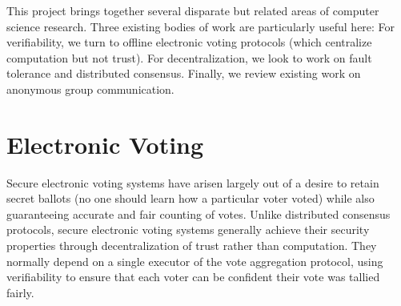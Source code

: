%
%
%
This project brings together several disparate but related areas of computer
science research.  Three existing bodies of work are particularly useful here:
For verifiability, we turn to offline electronic voting protocols (which
centralize computation but not trust). For decentralization, we look to work on
fault tolerance and distributed consensus.
Finally, we review existing work on anonymous group communication.
\section{Electronic Voting} \label{Section:evoting}
    Secure electronic voting systems have arisen largely out of a desire to
    retain secret ballots (no one should learn how a particular voter voted)
    while also guaranteeing accurate and fair counting of votes. Unlike
    distributed consensus protocols, secure electronic voting systems generally
    achieve their security properties through decentralization of trust rather
    than computation. They normally depend on a single executor of the vote
    aggregation protocol, using verifiability to ensure that each voter can be
    confident their vote was tallied fairly.

